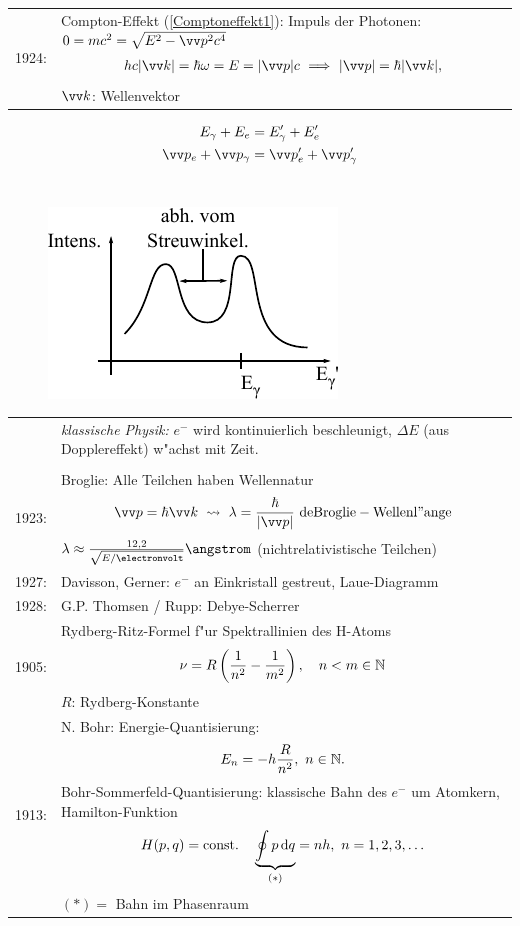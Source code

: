 \documentclass[a4paper]{scrartcl}
\newcommand{\NN}{\ensuremath \mathbb{N}}
\newcommand{\dd}{\ensuremath \, \mathrm{d}}
\begin{document}
\begin{tabular}{l p{400pt}}
1924: &
Compton-Effekt (\ref{Comptoneffekt1}): Impuls der Photonen: $0 = mc^2 = \sqrt{ E^2 - \vv p^2 c^4 }$
\begin{align}
h c \vert \vv k \vert = \hbar \omega = E = \vert \vv p \vert c \ \Longrightarrow \ \vert \vv p \vert = \hbar \vert\vv k \vert,
\end{align}
$\vv k$: Wellenvektor
\end{tabular}
\begin{align*}
E_\gamma + E_e & = E_\gamma' + E_e' \\
\vv p_e + \vv p_\gamma & = \vv p_e' + \vv p_\gamma'
\end{align*}
\\
\begin{figure}[h]
\centering
\includegraphics{002Intensitat} 
\label{002Intensitat}
\end{figure}

\begin{tabular}{l p{400pt}}
& \emph{klassische Physik:} $e^-$ wird kontinuierlich beschleunigt, $\Delta E$ (aus Dopplereffekt) w"achst mit Zeit. \\
\\
1923: & Broglie: Alle Teilchen haben Wellennatur
$$\vv p = \hbar \vv k \ \leadsto \  \lambda = \frac{\hbar}{ \vert \vv p \vert } \ \mathrm{ deBroglie-Wellenl"ange}$$
$\lambda \approx \frac{12,2}{\sqrt{ E/ \electronvolt}} \angstrom$ (nichtrelativistische Teilchen)
\\
1927: & Davisson, Gerner: $e^-$ an Einkristall gestreut, Laue-Diagramm \\
1928: & G.P. Thomsen / Rupp: Debye-Scherrer \\
1905: & Rydberg-Ritz-Formel f"ur Spektrallinien des H-Atoms
$$\nu = R\left( \frac1{n^2} - \frac1{m^2} \right), \quad n<m \in \NN$$
$R$: Rydberg-Konstante \\
1913: & N. Bohr: Energie-Quantisierung: $$E_n = - h \frac{R}{n^2}, \ n \in \NN.$$
Bohr-Sommerfeld-Quantisierung: klassische Bahn des $e^-$ um Atomkern, Hamilton-Funktion 
$$H(p,q) = \mathrm{const.} \quad \underbrace{\oint p \dd q}_{(*)} = nh, \ n = 1,2,3, \ldots$$
$(*) = $ Bahn im Phasenraum
\end{tabular}
\end{document}
